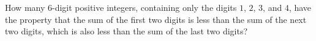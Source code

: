 How many $6$-digit positive integers, containing only the digits $1$, $2$, $3$, and $4$, have the property that the sum of the first two digits is less than the sum of the next two digits, which is also less than the sum of the last two digits?
